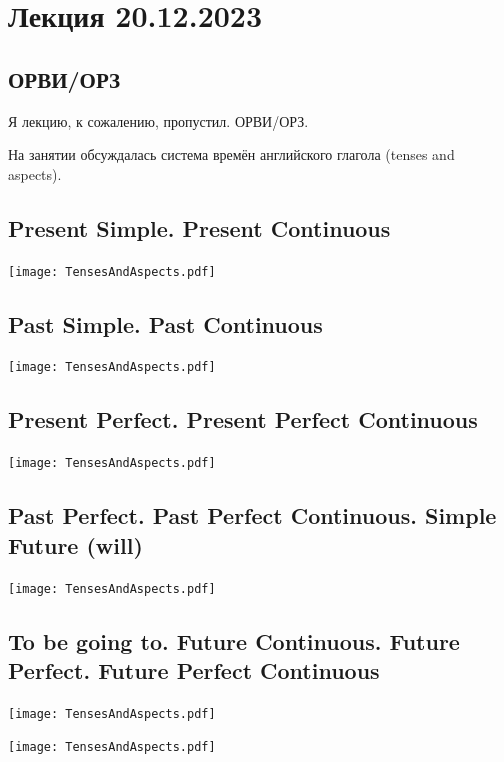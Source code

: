 \documentclass[main.tex]{subfiles}
\begin{document}
\section{Лекция 20.12.2023}

\subsection{ОРВИ/ОРЗ}

Я лекцию, к сожалению, пропустил. ОРВИ/ОРЗ.

На занятии обсуждалась система времён английского глагола (tenses and aspects).

\subsection{Present Simple. Present Continuous}
\vspace{-10mm}
{\parindent-20pt\texttt{[image: TensesAndAspects.pdf]}}\newpage

\subsection{Past Simple. Past Continuous}
\vspace{-5mm}
{\parindent-20pt\texttt{[image: TensesAndAspects.pdf]}}\newpage

\subsection{Present Perfect. Present Perfect Continuous}
\vspace{-5mm}
{\parindent-20pt\texttt{[image: TensesAndAspects.pdf]}}\newpage

\subsection{Past Perfect. Past Perfect Continuous. Simple Future (will)}
\vspace{-5mm}
{\parindent-20pt\texttt{[image: TensesAndAspects.pdf]}}\newpage

\subsection{To be going to. Future Continuous. Future Perfect. Future Perfect Continuous}
\vspace{-5mm}
{\parindent-20pt\texttt{[image: TensesAndAspects.pdf]}}\newpage

{\parindent-20pt\texttt{[image: TensesAndAspects.pdf]}}\newpage
\end{document}
